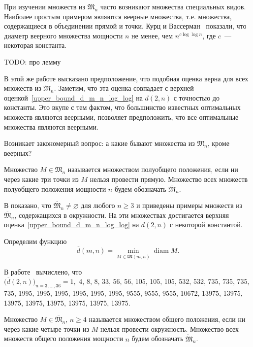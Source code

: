 При изучении множеств из $\mathfrak{M}_n$ часто возникают множества специальных видов.
Наиболее простым примером являются веерные множества, т.е. множества, содержащиеся в объединении прямой и точки.
Курц и Вассерман~\cite{kurz2008minimum} показали, что диаметр веерного множества мощности $n$
не менее, чем $n^{c \log \log n}$, где $c$~--- некоторая константа.

TODO: про лемму

В этой же работе высказано предположение, что подобная оценка верна для всех множеств из $\mathfrak{M}_n$.
Заметим, что эта оценка совпадает с верхней оценкой~\eqref{upper_bound_d_m_n_log_log} на $d(2,n)$
с точностью до константы.
Это вкупе с тем фактом, что большинство известных оптимальных множеств являются веерными,
позволяет предположить, что все оптимальные множества являются веерными.

Возникает закономерный вопрос: а какие бывают множества из $\mathfrak{M}_n$,
кроме веерных?

\begin{definition}
	\cite{kurz2008minimum} Множество $M\in\mathfrak{M}_n$ называется множеством полуобщего положения,
	если ни через какие три точки из $M$ нельзя провести прямую.
	Множество всех множеств полуобщего положения мощности $n$ будем обозначать $\overline{\mathfrak{M}}_n$.
\end{definition}

В \cite{harborth1993upper} показано, что $\overline{\mathfrak{M}}_n\neq\varnothing$ для любого $n \geq 3$
и приведены примеры множеств из $\overline{\mathfrak{M}}_n$, содержащихся в окружности.
На эти множествах достигается верхняя оценка~\eqref{upper_bound_d_m_n_log_log} на $d(2,n)$
с некоторой константой.

Определим функцию~\cite{kurz2008minimum}
\begin{equation*}
	\overline{d}(m,n) = \min_{M\in\overline{\mathfrak{M}}(m,n)} \operatorname{diam} M
	.
\end{equation*}

В работе~\cite{kurz2008minimum} вычислено, что
\\
$\bigl(\overline{d}(2, n)\bigr)_{n=3,...,36} = 1,$
4, 8, 8, 33, 56, 56, 105, 105, 105, 532, 532, 735, 735, 735, 735,
1995, 1995, 1995, 1995, 1995, 1995, 9555, 9555, 9555, 10672,
13975, 13975, 13975, 13975, 13975, 13975, 13975, 13975.

\begin{definition}
	\cite{kurz2008minimum} Множество $M\in\overline{\mathfrak{M}}_n$, $n\geq 4$ называется множеством общего положения,
	если ни через какие четыре точки из $M$ нельзя провести окружность.
	Множество всех множеств общего положения мощности $n$ будем обозначать $\dot{\mathfrak{M}}_n$.
\end{definition}


